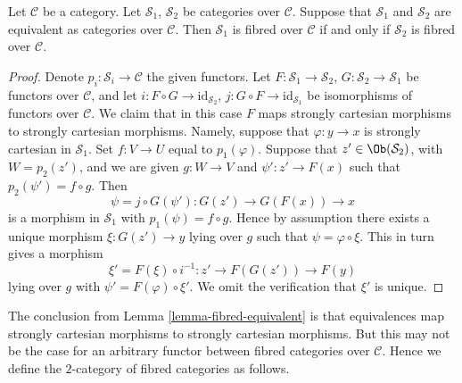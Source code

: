 \begin{lemma}
\label{lemma-fibred-equivalent}
Let $\mathcal{C}$ be a category.
Let $\mathcal{S}_1$, $\mathcal{S}_2$ be categories over $\mathcal{C}$.
Suppose that $\mathcal{S}_1$ and $\mathcal{S}_2$ are equivalent
as categories over $\mathcal{C}$.
Then $\mathcal{S}_1$ is fibred over $\mathcal{C}$ if and only if
$\mathcal{S}_2$ is fibred over $\mathcal{C}$.
\end{lemma}

\begin{proof}
Denote $p_i : \mathcal{S}_i \to \mathcal{C}$ the given functors.
Let $F : \mathcal{S}_1 \to \mathcal{S}_2$,
$G : \mathcal{S}_2 \to \mathcal{S}_1$ be functors over $\mathcal{C}$, and let
$i : F \circ G \to \text{id}_{\mathcal{S}_2}$,
$j : G \circ F \to \text{id}_{\mathcal{S}_1}$ be isomorphisms of
functors over $\mathcal{C}$.
We claim that in this case $F$ maps strongly cartesian morphisms
to strongly cartesian morphisms. Namely, suppose that
$\varphi : y \to x$ is strongly cartesian in $\mathcal{S}_1$.
Set $f : V \to U$ equal to $p_1(\varphi)$. Suppose that
$z' \in \Ob(\mathcal{S}_2)$, with $W = p_2(z')$, and we are given
$g : W \to V$ and $\psi' : z' \to F(x)$ such that
$p_2(\psi') = f \circ g$. Then
$$
\psi = j \circ G(\psi') : G(z') \to G(F(x)) \to x
$$
is a morphism in $\mathcal{S}_1$ with $p_1(\psi) = f \circ g$.
Hence by assumption there exists a unique morphism $\xi : G(z') \to y$
lying over $g$ such that $\psi = \varphi \circ \xi$. This in turn gives a
morphism
$$
\xi' = F(\xi) \circ i^{-1} : z' \to F(G(z')) \to F(y)
$$
lying over $g$ with $\psi' = F(\varphi) \circ \xi'$. We omit the verification
that $\xi'$ is unique.
\end{proof}

\noindent
The conclusion from Lemma \ref{lemma-fibred-equivalent} is that
equivalences map strongly cartesian morphisms to strongly cartesian
morphisms. But this may not be the case for an arbitrary functor between
fibred categories over $\mathcal{C}$. Hence we define the $2$-category
of fibred categories as follows.


